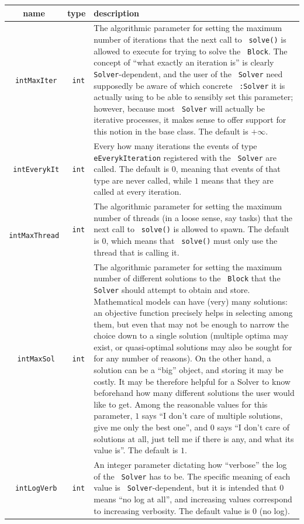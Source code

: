 \documentclass[a4paper]{article}
\newcommand{\code}[1]{\textrm{\texttt{\hyphenchar\font=200 #1}}}
\def\Block{\code{Block}\xspace}
\def\Solver{\code{Solver}\xspace}
\def\dSolver{\code{:Solver}\xspace}
\begin{document}
\begin{longtable}{|c|c|p{13cm}|}
 \hline
 name & type & description \\
 \hline
 \code{intMaxIter} & \code{int} & The algorithmic parameter for setting the maximum number of iterations that the next call to \code{solve()} is allowed to execute for trying to solve the \Block. The concept of ``what exactly an iteration is'' is clearly \Solver-dependent, and the user of the \Solver need supposedly be aware of which concrete \dSolver it is actually using to be able to sensibly set this parameter; however, because most \Solver will actually be iterative processes, it makes sense to offer  support for this notion in the base class. The default is $+\infty$. \\
 \hline
 \code{intEverykIt} & \code{int} & Every how many iterations the events of type \code{eEverykIteration} registered with the \Solver are called. The default is $0$, meaning that events of that type are never called, while $1$ means that they are called at every iteration. \\
 \hline
 \code{intMaxThread} & \code{int} & The algorithmic parameter for setting the maximum number of threads (in a loose sense, say tasks) that the next call to \code{solve()} is allowed to spawn. The default is $0$, which means that \code{solve()} must only use the thread that is calling it. \\
 \hline
 \code{intMaxSol} & \code{int} & The algorithmic parameter for setting the maximum  number of different solutions to the \Block that the \Solver should attempt to obtain and store. Mathematical models can have (very) many solutions: an objective function precisely helps in selecting among them, but even that may not be enough to narrow the choice down to a single solution (multiple optima may exist, or quasi-optimal solutions may also be sought for for any number of reasons). On the other hand, a solution can be a ``big'' object, and storing it may be costly. It may be therefore helpful for a Solver to know beforehand how many different solutions the user would like to get. Among the reasonable values for this parameter, $1$ says ``I don't care of multiple solutions, give me only the best one'', and $0$ says ``I don't care of solutions at all, just tell me if there is any, and what its value is''. The default is $1$. \\
 \hline
 \code{intLogVerb} & \code{int} & An integer parameter dictating how ``verbose'' the log of the \Solver has to be. The specific meaning of each value is \Solver-dependent, but it is intended that $0$ means ``no log at all'', and increasing values correspond to increasing verbosity. The default value is $0$ (no log). \\

\end{longtable}
\end{document}
